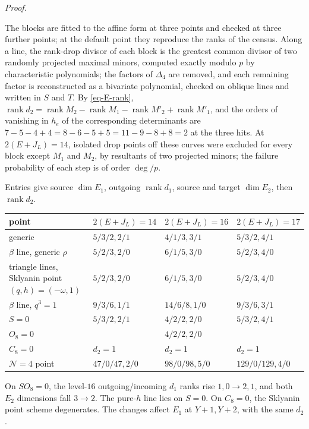 \documentclass[11pt]{article}
\numberwithin{equation}{section}
\numberwithin{figure}{section}
\numberwithin{table}{section}
\begin{document}
\begin{proofbox}
\emph{Proof.}

The blocks are fitted to the affine form at three points and checked at three further points; at the default point they reproduce the ranks of the census. Along a line, the rank-drop divisor of each block is the greatest common divisor of two randomly projected maximal minors, computed exactly modulo $p$ by characteristic polynomials; the factors of $\Delta_4$ are removed, and each remaining factor is reconstructed as a bivariate polynomial, checked on oblique lines and written in $S$ and $T$. By \eqref{eq-E-rank}, $\operatorname{rank}d_2=\operatorname{rank}M_2-\operatorname{rank}M_1-\operatorname{rank}M'_2+\operatorname{rank}M'_1$, and the orders of vanishing in $h_e$ of the corresponding determinants are $7-5-4+4=8-6-5+5=11-9-8+8=2$ at the three hits. At $2(E+J_L)=14$, isolated drop points off these curves were excluded for every block except $M_1$ and $M_2$, by resultants of two projected minors; the failure probability of each step is of order $\deg/p$.\hfill\qedsymbol
\end{proofbox}

Entries give source $\dim E_1$, outgoing $\operatorname{rank}d_1$, source and target $\dim E_2$, then $\operatorname{rank}d_2$.

{\small\renewcommand{\arraystretch}{1.25}\setlength{\tabcolsep}{4pt}
\begin{xltabular}{\linewidth}{@{}>{\raggedright\arraybackslash}Xlll@{}}
\toprule
point & $2(E+J_L)=14$ & $2(E+J_L)=16$ & $2(E+J_L)=17$\\
\midrule\endhead
generic & $5/3/2,2/1$ & $4/1/3,3/1$ & $5/3/2,4/1$\\
$\beta$ line, generic $\rho$ & $5/2/3,2/0$ & $6/1/5,3/0$ & $5/2/3,4/0$\\
triangle lines, Sklyanin point $(q,h)=(-\omega,1)$ & $5/2/3,2/0$ & $6/1/5,3/0$ & $5/2/3,4/0$\\
$\beta$ line, $q^3=1$ & $9/3/6,1/1$ & $14/6/8,1/0$ & $9/3/6,3/1$\\
$S=0$ & $5/3/2,2/1$ & $4/2/2,2/0$ & $5/3/2,4/1$\\
$O_8=0$ &  & $4/2/2,2/0$ & \\
$C_8=0$ & $d_2=1$ & $d_2=1$ & $d_2=1$\\
$\mathcal N=4$ point & $47/0/47,2/0$ & $98/0/98,5/0$ & $129/0/129,4/0$\\
\bottomrule
\end{xltabular}}

On $S O_8=0$, the level-$16$ outgoing/incoming $d_1$ ranks rise $1,0\to2,1$, and both $E_2$ dimensions fall $3\to2$. The pure-$h$ line lies on $S=0$. On $C_8=0$, the Sklyanin point scheme degenerates. The changes affect $E_1$ at $Y+1,Y+2$, with the same $d_2$.
\end{document}
